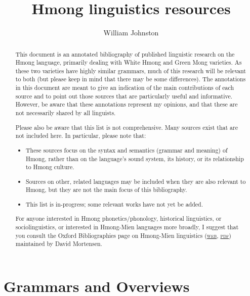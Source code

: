 \documentclass[11pt,DIV=12]{scrartcl}
\title{Hmong linguistics resources}
\author{William Johnston}
\date{} %
\begin{document}
\maketitle
\raggedbottom

\renewcommand{\abstractname}{}
\begin{abstract}
\noindent
This document is an annotated bibliography of published linguistic research on the Hmong language, primarily dealing with White Hmong and Green Mong varieties. As these two varieties have highly similar grammars, much of this research will be relevant to both (but please keep in mind that there may be some differences). The annotations in this document are meant to give an indication of the main contributions of each source and to point out those sources that are particularly useful and informative. However, be aware that these annotations represent my opinions, and that these are not necessarily shared by all linguists. 

Please also be aware that this list is not comprehensive. Many sources exist that are not included here. In particular, please note that: 

\begin{itemize}
\item These sources focus on the syntax and semantics (grammar and meaning) of Hmong, rather than on the language's sound system, its history, or its relationship to Hmong culture. 
\item Sources on other, related languages may be included when they are also relevant to Hmong, but they are not the main focus of this bibliography. 
\item This list is in-progress; some relevant works have not yet be added. 
\end{itemize}

For anyone interested in Hmong phonetics/phonology, historical linguistics, or sociolinguistics, or interested in Hmong-Mien languages more broadly, I suggest that you consult the Oxford Bibliographies page on Hmong-Mien linguistics 
(\href{https://www.oxfordbibliographies.com/view/document/obo-9780199772810/obo-9780199772810-0173.xml}{\textsc{web}}, 
\href{https://williamjohnston.github.io/files/Mortensen-2014.pdf}{\textsc{pdf}}) maintained by David Mortensen.
\end{abstract}

\newpage
\tableofcontents

\newpage
\section{Grammars and Overviews}\label{overviews}
\vspace{-0.5\baselineskip}
\end{document}

